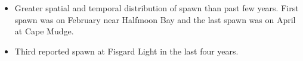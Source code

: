\begin{itemize}

\item Greater spatial and temporal distribution of spawn than past few years.
First spawn was on February  near Halfmoon Bay and
the last spawn was on April  at Cape Mudge.

\item Third reported spawn at Fisgard Light in the last four years.

\end{itemize}